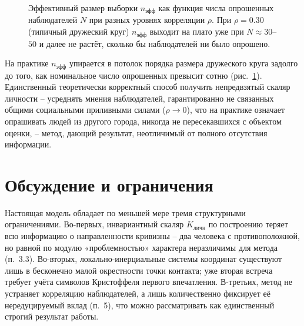 \documentclass[11pt,a4paper]{article}
\begin{document}
\begin{figure}[htbp]
\centering
{}
\caption{Эффективный размер выборки $n_{\text{эфф}}$ как функция числа опрошенных наблюдателей $N$ при разных уровнях корреляции $\rho$. При $\rho=0.30$ (типичный дружеский круг) $n_{\text{эфф}}$ выходит на плато уже при $N\approx30$--$50$ и далее не растёт, сколько бы наблюдателей ни было опрошено.}
\label{fig:neff}
\end{figure}

На практике $n_{\text{эфф}}$ упирается в потолок порядка размера дружеского круга задолго до того, как номинальное число опрошенных превысит сотню (рис.~\ref{fig:neff}). Единственный теоретически корректный способ получить непредвзятый скаляр личности -- усреднять мнения наблюдателей, гарантированно не связанных общими социальными приливными силами ($\rho\to0$), что на практике означает опрашивать людей из другого города, никогда не пересекавшихся с объектом оценки, -- метод, дающий результат, неотличимый от полного отсутствия информации.

\section{Обсуждение и ограничения}

Настоящая модель обладает по меньшей мере тремя структурными ограничениями. Во-первых, инвариантный скаляр $K_{\text{личн}}$ по построению теряет всю информацию о направленности кривизны -- два человека с противоположной, но равной по модулю «проблемностью» характера неразличимы для метода (п.~3.3). Во-вторых, локально-инерциальные системы координат существуют лишь в бесконечно малой окрестности точки контакта; уже вторая встреча требует учёта символов Кристоффеля первого впечатления. В-третьих, метод не устраняет корреляцию наблюдателей, а лишь количественно фиксирует её нередуцируемый вклад (п.~5), что можно рассматривать как единственный строгий результат работы.
\end{document}
